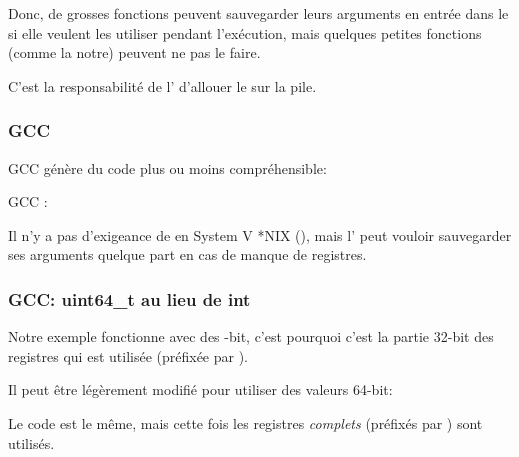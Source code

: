 Donc, de grosses fonctions peuvent sauvegarder leurs arguments en entrée dans le 
si elle veulent les utiliser pendant l'exécution, mais quelques petites fonctions
(comme la notre) peuvent ne pas le faire.

C'est la responsabilité de l' d'allouer le 
sur la pile.

\subsubsection{GCC}

GCC \Optimizing génère du code plus ou moins compréhensible:



GCC \NonOptimizing:




Il n'y a pas d'exigeance de  en System V *NIX (\SysVABI), mais
l' peut vouloir sauvegarder ses arguments quelque part
en cas de manque de registres.

\subsubsection{GCC: uint64\_t au lieu de int}


Notre exemple fonctionne avec des -bit, c'est pourquoi c'est la partie 32-bit
des registres qui est utilisée (préfixée par ).

Il peut être légèrement modifié pour utiliser des valeurs 64-bit:





Le code est le même, mais cette fois les registres \emph{complets} (préfixés par ) sont utilisés.

